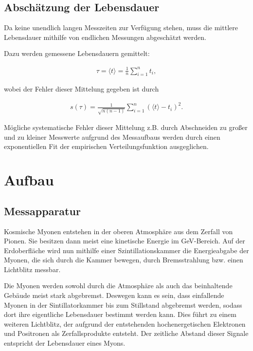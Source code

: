 \subsection{Absch\"atzung der Lebensdauer}
Da keine unendlich langen Messzeiten zur Verf\"ugung stehen, muss die mittlere Lebensdauer mithilfe von endlichen Messungen abgesch\"atzt werden.

Dazu werden gemessene Lebensdauern gemittelt:

\begin{align}
	\tau = \langle t \rangle = \frac{1}{n} \sum_{i=1}^{n} t_i,
\end{align}

wobei der Fehler dieser Mittelung gegeben ist durch

\begin{align}
	s(\tau) = \frac{1}{\sqrt{n(n-1)}} \sum_{i=1}^{n} (\langle t \rangle - t_i)^2 .
\end{align}

M\"ogliche systematische Fehler dieser Mittelung z.B. durch Abschneiden zu gro{\ss}er und zu kleiner Messwerte aufgrund des Messaufbaus werden durch einen exponentiellen Fit der empirischen Verteilungsfunktion ausgeglichen.

\section{Aufbau}
\subsection{Messapparatur}
Kosmische Myonen entstehen in der oberen Atmosph\"are aus dem Zerfall von Pionen. Sie besitzen dann meist eine kinetische Energie im GeV-Bereich. Auf der Erdoberfl\"ache wird nun mithilfe einer Szintillationskammer die Energieabgabe der Myonen, die sich durch die Kammer bewegen, durch Bremsstrahlung bzw. einen Lichtblitz messbar. 

Die Myonen werden sowohl durch die Atmosph\"are als auch das beinhaltende Geb\"aude meist stark abgebremst. Deswegen kann es sein, dass einfallende Myonen in der Sintillatorkammer bis zum Stillstand abgebremst werden, sodass dort ihre eigentliche Lebensdauer bestimmt werden kann. Dies f\"uhrt zu einem weiteren Lichtblitz, der aufgrund der entstehenden hochenergetischen Elektronen und Positronen als Zerfallsprodukte entsteht. Der zeitliche Abstand dieser Signale entspricht der Lebensdauer eines Myons.

